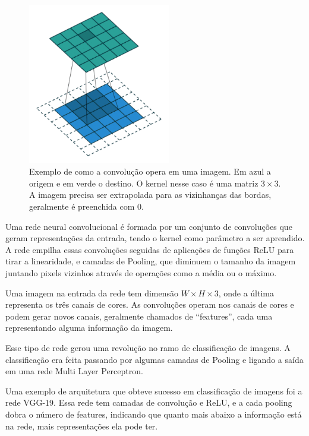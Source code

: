 \begin{figure}[!ht]
	\centering
	\includegraphics[height=200pt]{files/assets/deeplearning/conv.png}
	\caption{Exemplo de como a convolução opera em uma imagem.
	Em azul a origem e em verde o destino. O kernel nesse caso
	é uma matriz $3\times 3$. A imagem precisa ser extrapolada
	para as vizinhanças das bordas, geralmente é preenchida
	com 0.}
	\label{img:preview}
\end{figure}



Uma rede neural convolucional é formada
por um conjunto de convoluções que
geram representações da entrada, 
tendo o kernel como parâmetro a ser aprendido.
A rede empilha essas convoluções seguidas
de aplicações de funções ReLU para tirar
a linearidade, e camadas de Pooling,
que diminuem o tamanho da imagem
juntando pixels vizinhos através de
operações como a média ou o máximo.


Uma imagem na entrada da rede tem 
dimensão $W\times H \times 3$,
onde a última representa os três
canais de cores.
As convoluções operam nos canais
de cores e podem gerar novos canais,
geralmente chamados de ``features'',
cada uma representando alguma informação
da imagem.


Esse tipo de rede gerou uma revolução
no ramo de classificação de imagens.
A classificação era feita passando
por algumas camadas de Pooling e
ligando a saída em uma rede Multi
Layer Perceptron.

Uma exemplo de arquitetura que obteve
sucesso em classificação de imagens
foi a rede VGG-19. Essa rede 
tem camadas de convolução e ReLU,
e a cada pooling dobra o número
de features, indicando que quanto
mais abaixo a informação está na rede,
mais representações ela pode ter.

